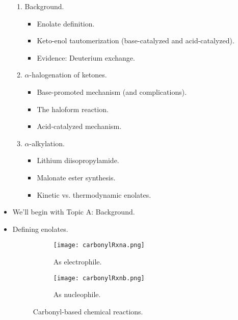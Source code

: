 \documentclass[../notes.tex]{subfiles}
\begin{document}
\begin{itemize}
\begin{enumerate}[label={\Alph*.}]
        \item Background.
        \begin{itemize}
            \item Enolate definition.
            \item Keto-enol tautomerization (base-catalyzed and acid-catalyzed).
            \item Evidence: Deuterium exchange.
        \end{itemize}
        \item $\alpha$-halogenation of ketones.
        \begin{itemize}
            \item Base-promoted mechanism (and complications).
            \item The haloform reaction.
            \item Acid-catalyzed mechanism.
        \end{itemize}
        \item $\alpha$-alkylation.
        \begin{itemize}
            \item Lithium diisopropylamide.
            \item Malonate ester synthesis.
            \item Kinetic vs. thermodynamic enolates.
        \end{itemize}
    \end{enumerate}
    \pagebreak
    \item We'll begin with Topic A: Background.
    \item Defining enolates.
    \begin{figure}[h!]
        \centering
        \begin{subfigure}[b]{0.4\linewidth}
            \centering
            \texttt{[image: carbonylRxna.png]}
            \caption{As electrophile.}
            \label{fig:carbonylRxna}
        \end{subfigure}
        \begin{subfigure}[b]{0.4\linewidth}
            \centering
            \texttt{[image: carbonylRxnb.png]}
            \caption{As nucleophile.}
            \label{fig:carbonylRxnb}
        \end{subfigure}
        \caption{Carbonyl-based chemical reactions.}
        \label{fig:carbonylRxn}
    \end{figure}
    \begin{itemize}

\end{itemize}
\end{itemize}
\end{document}
